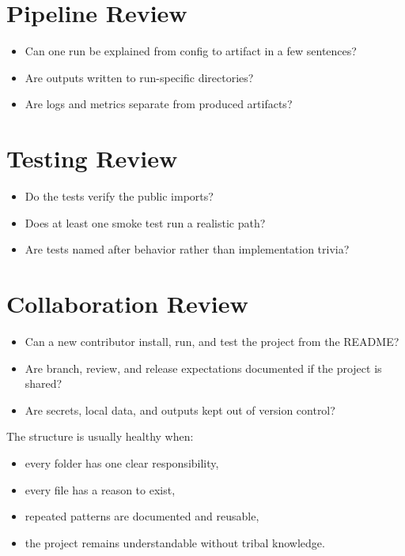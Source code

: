 \documentclass[11pt,oneside]{book}
\begin{document}
\section*{Pipeline Review}

\begin{itemize}
  \item Can one run be explained from config to artifact in a few sentences?
  \item Are outputs written to run-specific directories?
  \item Are logs and metrics separate from produced artifacts?
\end{itemize}

\section*{Testing Review}

\begin{itemize}
  \item Do the tests verify the public imports?
  \item Does at least one smoke test run a realistic path?
  \item Are tests named after behavior rather than implementation trivia?
\end{itemize}

\section*{Collaboration Review}

\begin{itemize}
  \item Can a new contributor install, run, and test the project from the README?
  \item Are branch, review, and release expectations documented if the project is shared?
  \item Are secrets, local data, and outputs kept out of version control?
\end{itemize}

The structure is usually healthy when:
\begin{itemize}
  \item every folder has one clear responsibility,
  \item every file has a reason to exist,
  \item repeated patterns are documented and reusable,
  \item the project remains understandable without tribal knowledge.
\end{itemize}
\end{document}
